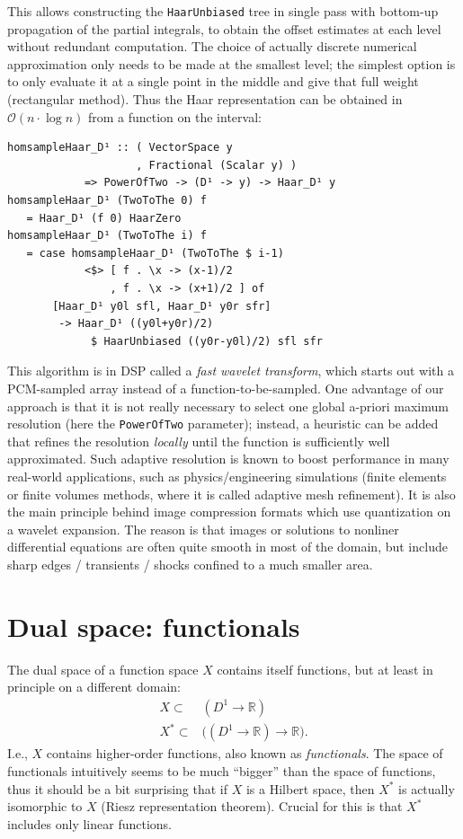 \documentclass[sigplan,review,anonymous]{acmart}\settopmatter{printfolios=true,printccs=false,printacmref=false}
\begin{document}
This allows constructing the \lstinline`HaarUnbiased` tree in single pass with bottom-up propagation of the partial integrals, to obtain the offset estimates at each level without redundant computation. The choice of actually discrete numerical approximation only needs to be made at the smallest level; the simplest option is to only evaluate it at a single point in the middle and give that full weight (rectangular method). Thus the Haar representation can be obtained in $\mathcal{O}(n\cdot\log n)$ from a function on the interval:
\begin{lstlisting}
homsampleHaar_D¹ :: ( VectorSpace y
                    , Fractional (Scalar y) )
            => PowerOfTwo -> (D¹ -> y) -> Haar_D¹ y
homsampleHaar_D¹ (TwoToThe 0) f
   = Haar_D¹ (f 0) HaarZero
homsampleHaar_D¹ (TwoToThe i) f
   = case homsampleHaar_D¹ (TwoToThe $ i-1)
            <$> [ f . \x -> (x-1)/2
                , f . \x -> (x+1)/2 ] of
       [Haar_D¹ y0l sfl, Haar_D¹ y0r sfr]
        -> Haar_D¹ ((y0l+y0r)/2)
             $ HaarUnbiased ((y0r-y0l)/2) sfl sfr
\end{lstlisting}
This algorithm is in DSP called a \emph{fast wavelet transform}, which starts out with a PCM-sampled array instead of a function-to-be-sampled.
One advantage of our approach is that it is not really necessary to select one global a-priori maximum resolution (here the \lstinline`PowerOfTwo` parameter); instead, a heuristic can be added that refines the resolution \emph{locally} until the function is sufficiently well approximated.
Such adaptive resolution is known to boost performance in many real-world applications, such as physics/engineering simulations (finite elements or finite volumes methods, where it is called adaptive mesh refinement). It is also the main principle behind image compression formats which use quantization on a wavelet expansion.
The reason is that images or solutions to nonliner differential equations are often quite smooth in most of the domain, but include sharp edges / transients / shocks confined to a much smaller area.

\section{Dual space: functionals}
The dual space of a function space $X$ contains itself functions, but at least in principle on a different domain:
\begin{align*}
  X \subset& (D^1 \to \mathbb{R})
 \\
  X^\ast \subset& \bigl((D^1 \to \mathbb{R}) \to \mathbb{R}\bigr).
\end{align*}
I.e., $X$ contains higher-order functions, also known as \emph{functionals}.
The space of functionals intuitively seems to be much “bigger” than the space of functions, thus it should be a bit surprising that if $X$ is a Hilbert space, then $X^\ast$ is actually isomorphic to $X$ (Riesz representation theorem). Crucial for this is that $X^\ast$ includes only linear functions.
\end{document}

